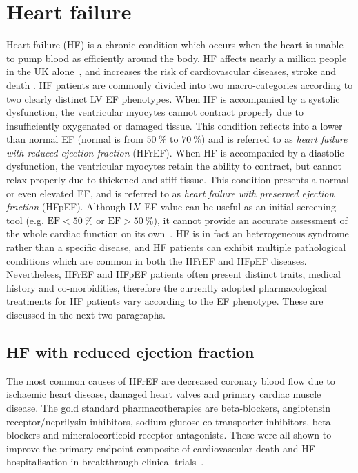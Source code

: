 %
%
%
\section{Heart failure}\label{sec:ch1heart_failure}
Heart failure (\acs{HF}) is a chronic condition which occurs when the heart is unable to pump blood as efficiently around the body. HF affects nearly a million people in the UK alone~\cite{Bhf:2021}, and increases the risk of cardiovascular diseases, stroke and death \cite{Adelborg:2017, Henkel:2008}. HF patients are commonly divided into two macro-categories according to two clearly distinct LV EF phenotypes. When HF is accompanied by a systolic dysfunction, the ventricular myocytes cannot contract properly due to insufficiently oxygenated or damaged tissue. This condition reflects into a lower than normal EF (normal is from $\SI{50}{\percent}$ to $\SI{70}{\percent}$) and is referred to as \textit{heart failure with reduced ejection fraction} (\acs{HFrEF}). When HF is accompanied by a diastolic dysfunction, the ventricular myocytes retain the ability to contract, but cannot relax properly due to thickened and stiff tissue. This condition presents a normal or even elevated EF, and is referred to as \textit{heart failure with preserved ejection fraction} (\acs{HFpEF}). Although LV EF value can be useful as an initial screening tool (e.g. $\textrm{EF}<\SI{50}{\percent}$ or $\textrm{EF}>\SI{50}{\percent}$), it cannot provide an accurate assessment of the whole cardiac function on its own~\cite{Guyton:2021}. HF is in fact an heterogeneous syndrome rather than a specific disease, and HF patients can exhibit multiple pathological conditions which are common in both the HFrEF and HFpEF diseases. Nevertheless, HFrEF and HFpEF patients often present distinct traits, medical history and co-morbidities, therefore the currently adopted pharmacological treatments for HF patients vary according to the EF phenotype. These are discussed in the next two paragraphs.


%
%
%
\subsection{HF with reduced ejection fraction}\label{sec:ch1HF_with_reduced_ejection_fraction}
The most common causes of HFrEF are decreased coronary blood flow due to ischaemic heart disease, damaged heart valves and primary cardiac muscle disease. The gold standard pharmacotherapies are beta-blockers, angiotensin receptor/neprilysin inhibitors, sodium-glucose co-transporter inhibitors, beta-blockers and mineralocorticoid receptor antagonists. These were all shown to improve the primary endpoint composite of cardiovascular death and HF hospitalisation in breakthrough clinical trials~\cite{Debska-Kozlowska:2021}.

